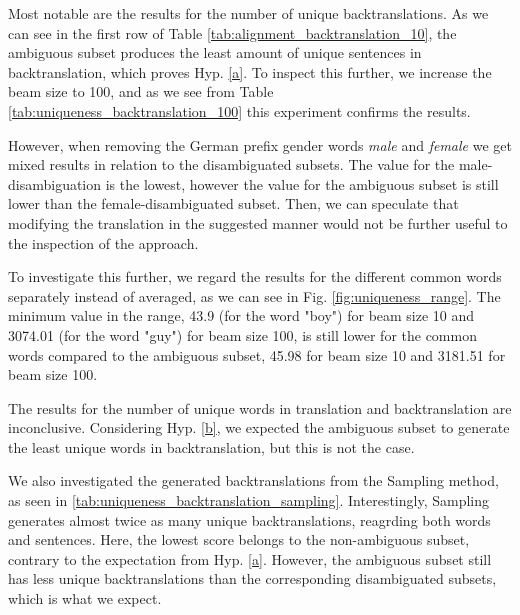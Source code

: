 Most notable are the results for the number of unique backtranslations. As we can see in the first row of Table \ref{tab:alignment_backtranslation_10}, the ambiguous subset produces the least amount of unique sentences in backtranslation, which proves Hyp. \ref{a}. To inspect this further, we increase the beam size to 100, and as we see from Table \ref{tab:uniqueness_backtranslation_100} this experiment confirms the results.

However, when removing the German prefix gender words \textit{male} and \textit{female} we get mixed results in relation to the disambiguated subsets. The value for the male-disambiguation is the lowest, however the value for the ambiguous subset is still lower than the female-disambiguated subset. Then, we can speculate that modifying the translation in the suggested manner would not be further useful to the inspection of the approach.

To investigate this further, we regard the results for the different common words separately instead of averaged, as we can see in Fig. \ref{fig:uniqueness_range}. The minimum value in the range, 43.9 (for the word "boy") for beam size 10 and 3074.01 (for the word "guy") for beam size 100, is still lower for the common words compared to the ambiguous subset, 45.98 for beam size 10 and 3181.51 for beam size 100.

The results for the number of unique words in translation and backtranslation are inconclusive. Considering Hyp. \ref{b}, we expected the ambiguous subset to generate the least unique words in backtranslation, but this is not the case.

We also investigated the generated backtranslations from the Sampling method, as seen in \ref{tab:uniqueness_backtranslation_sampling}. Interestingly, Sampling generates almost twice as many unique backtranslations, reagrding both words and sentences. Here, the lowest score belongs to the non-ambiguous subset, contrary to the expectation from Hyp. \ref{a}. However, the ambiguous subset still has less unique backtranslations than the corresponding disambiguated subsets, which is what we expect.


